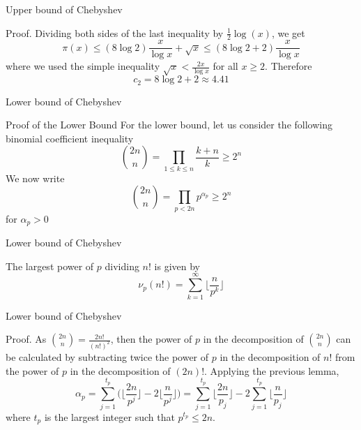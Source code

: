 \documentclass[18pt]{beamer}
\begin{document}
\begin{frame}{Upper bound of Chebyshev}
   \begin{block}{Proof.}
        Dividing both sides of the last inequality by $\frac{1}{2}\log{(x)}$, we get
        \[\pi(x) \leq (8\log{2})\frac{x}{\log{x}} + \sqrt{x} \leq (8\log{2}+2)\frac{x}{\log{x}}\]
        \pause{}
        where we used the simple inequality $\sqrt{x} < \frac{2x}{\log{x}}$ for all $x \geq 2$.
        \pause{}
    \pause{}
    Therefore
    \[c_2 = 8\log{2} + 2 \approx 4.41\]
   \end{block} 
\end{frame}

\begin{frame}{Lower bound of Chebyshev}
    \begin{block}{Proof of the Lower Bound}
        For the lower bound, let us consider the following binomial coefficient inequality
        \[{2n \choose n} = \prod\limits_{1 \leq k \leq n} \frac{k+n}{k} \geq 2^{n}\]
        \pause{}
        We now write
        \[{2n \choose n} = \prod\limits_{p < 2n} p^{\alpha_p} \geq 2^{n}\]
        for $\alpha_p > 0$
    \end{block}
\end{frame}

\begin{frame}{Lower bound of Chebyshev}
    \begin{lemma}
        The largest power of $p$ dividing $n!$ is given by
        \[\nu_p(n!) = \sum\limits_{k = 1} ^{\infty} \Bigr\lfloor{\frac{n}{p^{k}}}\Bigr\rfloor\]
    \end{lemma}
\end{frame}

\begin{frame}{Lower bound of Chebyshev}
    \begin{block}{Proof.}
        As ${2n \choose n} = \frac{2n!}{(n!)^{2}}$, then the power of $p$ in the decomposition of ${2n \choose n}$ can be calculated by subtracting twice the power of $p$ in the decomposition of $n!$ from the power of $p$ in the decomposition of $(2n)!$. Applying the previous lemma,
        \[\alpha_p = \sum\limits_{j = 1} ^{t_p} \Bigg(\Bigr\lfloor\frac{2n}{p^{j}}\Bigr\rfloor - 2\Bigr\lfloor\frac{n}{p^{j}}\Bigr\rfloor\Bigg) = \sum\limits_{j=1} ^{t_p} \Bigr\lfloor\frac{2n}{p_j}\Bigr\rfloor - 2 \sum\limits_{j = 1} ^{t_p} \Bigr\lfloor\frac{n}{p_j}\Bigr\rfloor\]
        where $t_p$ is the largest integer such that $p^{t_p} \leq 2n$.
        \newline
    \end{block}
\end{frame}
\end{document}
